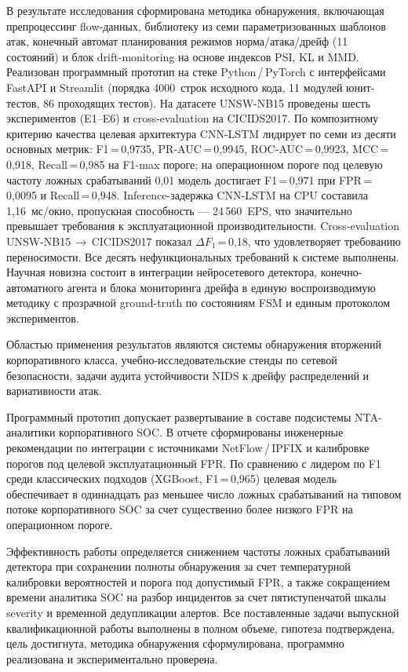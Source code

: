 В результате исследования сформирована методика обнаружения,
включающая препроцессинг flow-данных, библиотеку из семи
параметризованных шаблонов атак, конечный автомат планирования
режимов норма/атака/дрейф (11 состояний) и блок drift-monitoring
на основе индексов PSI, KL и MMD. Реализован программный прототип
на стеке Python\,/\,PyTorch с интерфейсами FastAPI и Streamlit
(порядка 4000~строк исходного кода, 11 модулей юнит-тестов, 86
проходящих тестов). На датасете UNSW-NB15 проведены шесть
экспериментов (E1--E6) и cross-evaluation на CICIDS2017. По
композитному критерию качества целевая архитектура CNN-LSTM
лидирует по семи из десяти основных метрик: F1\,=\,0,9735,
PR-AUC\,=\,0,9945, ROC-AUC\,=\,0,9923, MCC\,=\,0,918,
Recall\,=\,0,985 на F1-max пороге; на операционном пороге под
целевую частоту ложных срабатываний 0,01 модель достигает
F1\,=\,0,971 при FPR\,=\,0,0095 и Recall\,=\,0,948. Inference-задержка
CNN-LSTM на CPU составила 1,16~мс/окно, пропускная способность ---
24\,560~EPS, что значительно превышает требования к
эксплуатационной производительности. Cross-evaluation
UNSW-NB15\,$\to$\,CICIDS2017 показал
$\Delta F_1$\,=\,0,18, что удовлетворяет требованию переносимости.
Все десять нефункциональных требований к системе выполнены.
Научная новизна состоит в интеграции нейросетевого детектора,
конечно-автоматного агента и блока мониторинга дрейфа в единую
воспроизводимую методику с прозрачной ground-truth по состояниям
FSM и единым протоколом экспериментов.

Областью применения результатов являются системы обнаружения
вторжений корпоративного класса, учебно-исследовательские стенды
по сетевой безопасности, задачи аудита устойчивости NIDS к дрейфу
распределений и вариативности атак.

Программный прототип допускает развертывание в составе подсистемы
NTA-аналитики корпоративного SOC. В отчете сформированы инженерные
рекомендации по интеграции с источниками NetFlow\,/\,IPFIX и
калибровке порогов под целевой эксплуатационный FPR. По сравнению
с лидером по F1 среди классических подходов (XGBoost, F1\,=\,0,965)
целевая модель обеспечивает в одиннадцать раз меньшее число ложных
срабатываний на типовом потоке корпоративного SOC за счет
существенно более низкого FPR на операционном пороге.

Эффективность работы определяется снижением частоты ложных
срабатываний детектора при сохранении полноты обнаружения за счет
температурной калибровки вероятностей и порога под допустимый FPR,
а также сокращением времени аналитика SOC на разбор инцидентов за
счет пятиступенчатой шкалы severity и временной дедупликации
алертов. Все поставленные задачи выпускной квалификационной работы
выполнены в полном объеме, гипотеза подтверждена, цель достигнута,
методика обнаружения сформулирована, программно реализована и
экспериментально проверена.
